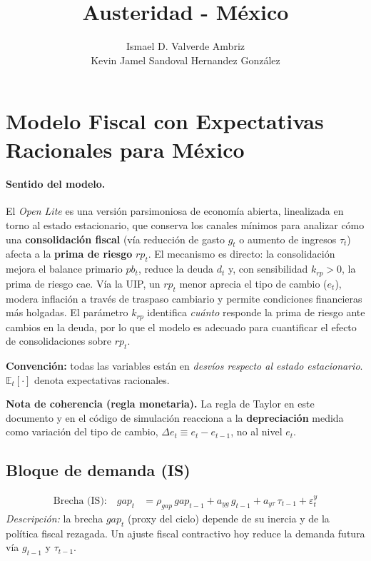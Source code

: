 \documentclass[12pt]{article}
\title{Austeridad - México}
\author{Ismael D. Valverde Ambriz \\ Kevin Jamel Sandoval Hernandez González}
\date{}
\begin{document}
\maketitle

\section*{Modelo Fiscal con Expectativas Racionales para México}

\paragraph{Sentido del modelo.}
El \emph{Open Lite} es una versión parsimoniosa de economía abierta, linealizada en torno al estado estacionario, que conserva los canales mínimos para analizar cómo una \textbf{consolidación fiscal} (vía reducción de gasto $g_t$ o aumento de ingresos $\tau_t$) afecta a la \textbf{prima de riesgo} $rp_t$. El mecanismo es directo: la consolidación mejora el balance primario $pb_t$, reduce la deuda $d_t$ y, con sensibilidad $k_{rp}>0$, la prima de riesgo cae. Vía la UIP, un $rp_t$ menor aprecia el tipo de cambio ($e_t$), modera inflación a través de traspaso cambiario y permite condiciones financieras más holgadas. El parámetro \textbf{$k_{rp}$} identifica \emph{cuánto} responde la prima de riesgo ante cambios en la deuda, por lo que el modelo es adecuado para cuantificar el efecto de consolidaciones sobre $rp_t$.

\medskip
\noindent\textbf{Convención:} todas las variables están en \emph{desvíos respecto al estado estacionario}. $\mathbb{E}_t[\cdot]$ denota expectativas racionales. 
\medskip

\noindent\textbf{Nota de coherencia (regla monetaria).} La regla de Taylor en este documento y en el código de simulación reacciona a la \textbf{depreciación} medida como variación del tipo de cambio, $\Delta e_t \equiv e_t - e_{t-1}$, no al nivel $e_t$.


\subsection*{Bloque de demanda (IS)}
\begin{align}
\text{Brecha (IS):}\quad 
gap_t &= \rho_{gap}\, gap_{t-1} + a_{yg}\, g_{t-1} + a_{y\tau}\, \tau_{t-1} + \varepsilon^y_t \tag{1}
\end{align}
\noindent\emph{Descripción:} la brecha $gap_t$ (proxy del ciclo) depende de su inercia y de la política fiscal rezagada. Un ajuste fiscal contractivo hoy reduce la demanda futura vía $g_{t-1}$ y $\tau_{t-1}$.
\end{document}
